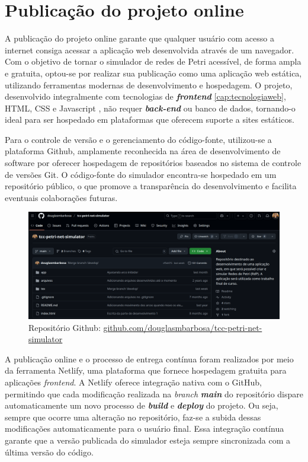\documentclass[
	12pt,				%
	openright,			%
	oneside,			%
	a4paper,			%
	english,			%
	brazil				%
	]{abntex2}
\begin{document}
\section{Publicação do projeto online}

A publicação do projeto online garante que qualquer usuário com acesso a internet consiga acessar a aplicação web desenvolvida através de um navegador. Com o objetivo de tornar o simulador de redes de Petri acessível, de forma ampla e gratuita, optou-se por realizar sua publicação como uma aplicação web estática, utilizando ferramentas modernas de desenvolvimento e hospedagem. O projeto, desenvolvido integralmente com tecnologias de \textbf{\textit{frontend}} \ref{cap:tecnologiaweb}, HTML, CSS e Javascript , não requer \textbf{\textit{back-end}} ou banco de dados, tornando-o ideal para ser hospedado em plataformas que oferecem suporte a sites estáticos. 

Para o controle de versão e o gerenciamento do código-fonte, utilizou-se a plataforma Github, amplamente reconhecida na área de desenvolvimento de software por oferecer hospedagem de repositórios baseados no sistema de controle de versões Git. O código-fonte do simulador encontra-se hospedado em um repositório público, o que promove a transparência do desenvolvimento e facilita eventuais colaborações futuras. 

\begin{figure}[ht] 
	\centering
	\includegraphics[scale=0.33]{figuras/repoGithub.png}
	\caption[Repositório Github]{Repositório Github:  \href{https://github.com/douglasmbarbosa/tcc-petri-net-simulator}{github.com/douglasmbarbosa/tcc-petri-net-simulator}}
	\label{fig:repoGithub}
\end{figure}
\FloatBarrier

A publicação online e o processo de entrega contínua foram realizados por meio da ferramenta Netlify, uma plataforma que fornece hospedagem gratuita para aplicações \textit{frontend}. A Netlify oferece integração nativa com o GitHub, permitindo que cada modificação realizada na \textit{branch} \textbf{\textit{main}} do repositório dispare automaticamente um novo processo de \textbf{\textit{build}} e \textbf{\textit{deploy}} do projeto. Ou seja, sempre que ocorre uma alteração no repositório, faz-se a subida dessas modificações automaticamente para o usuário final. Essa integração contínua garante que a versão publicada do simulador esteja sempre sincronizada com a última versão do código. 
\end{document}
